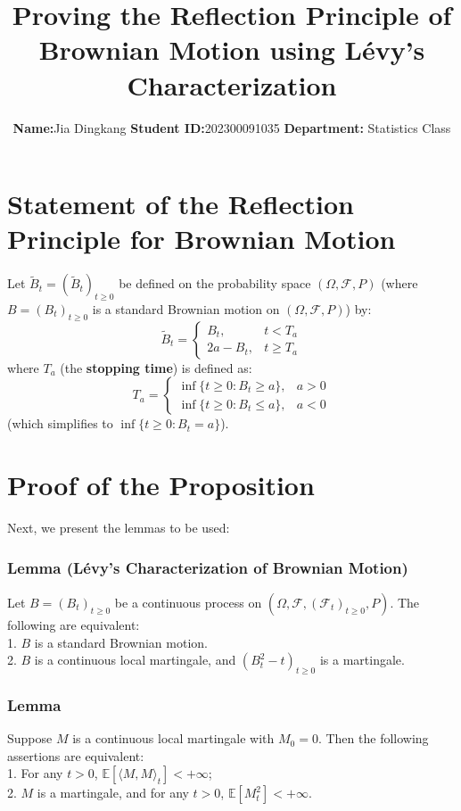 \documentclass[12pt,a4paper]{article}
\title{Proving the Reflection Principle of Brownian Motion using Lévy's Characterization}
\author{\textbf{Name:}Jia Dingkang  \textbf{Student ID:}202300091035  \textbf{Department:} Statistics Class}
\date{}
\theoremstyle{definition}
\begin{document}
	
	\maketitle
	\tableofcontents
	\newpage
	\section{Statement of the Reflection Principle for Brownian Motion}
	Let $\widetilde{B}_t = (\widetilde{B}_t)_{t \geq 0}$ be defined on the probability space $(\Omega, \mathcal{F}, P)$ (where $B = (B_t)_{t \geq 0}$ is a standard Brownian motion on $(\Omega, \mathcal{F}, P)$) by:
	\[
	\widetilde{B}_t = 
	\begin{cases} 
		B_t, & t < T_a \\
		2a - B_t, & t \geq T_a 
	\end{cases}
	\]
	where  $T_a$ (the \textbf{stopping time}) is defined as:
	\[
	T_a = 
	\begin{cases} 
		\inf\{ t \geq 0 : B_t \geq a \}, & a > 0 \\
		\inf\{ t \geq 0 : B_t \leq a \}, & a < 0 
	\end{cases}
	\]
	(which simplifies to $\inf\{ t \geq 0 : B_t = a \}$).
	
	\section{Proof of the Proposition}
    Next, we present the lemmas to be used:
	\subsubsection*{Lemma (Lévy's Characterization of Brownian Motion)}
	Let $B = (B_t)_{t \geq 0}$ be a continuous process on $(\Omega, \mathcal{F}, (\mathcal{F}_t)_{t \geq 0}, P)$. The following are equivalent:\\
	1. $B$ is a standard Brownian motion.\\
	2. $B$ is a continuous local martingale, and $(B_t^2 - t)_{t \geq 0}$ is a martingale.
	\subsubsection*{Lemma}
	 Suppose \( M \) is a continuous local martingale with \( M_0 = 0 \). Then the following assertions are equivalent:\\
	1. For any \( t > 0 \), \( \mathbb{E}\left[ \langle M, M \rangle_t \right] < +\infty \);\\
	2. \( M \) is a martingale, and for any \( t > 0 \), \( \mathbb{E}\left[ M_t^2 \right] < +\infty \).
\end{document}
